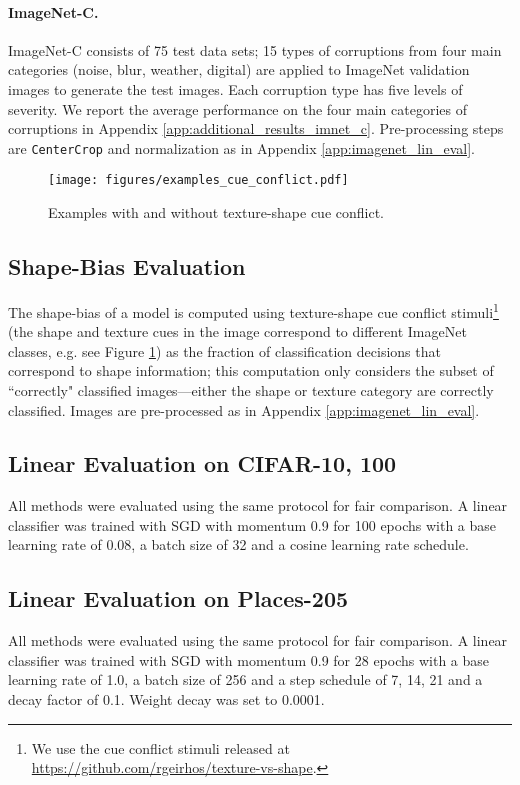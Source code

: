 \documentclass[twoside,11pt]{article}
\begin{document}
\paragraph{ImageNet-C.} ImageNet-C \citep{hendrycks_benchmarking_2019} consists of 75 test data sets; 15 types of corruptions from four main categories (noise, blur, weather, digital) are applied to ImageNet validation images to generate the test images. Each corruption type has five levels of severity. We report the average performance on the four main categories of corruptions in Appendix \ref{app:additional_results_imnet_c}. Pre-processing steps are \texttt{CenterCrop} and normalization as in Appendix \ref{app:imagenet_lin_eval}.


\begin{figure}
    \centering
    \texttt{[image: figures/examples\_cue\_conflict.pdf]}
    \caption{Examples with and without texture-shape cue conflict.}
    \label{fig:cue_conflict_stim}
\end{figure}

\subsection{Shape-Bias Evaluation}
The shape-bias \citep{geirhos2019imagenettrained} of a model is computed using texture-shape cue conflict stimuli\footnote{We use the cue conflict stimuli released at \url{https://github.com/rgeirhos/texture-vs-shape}.} (the shape and texture cues in the image correspond to different ImageNet classes, e.g. see Figure \ref{fig:cue_conflict_stim}) as the fraction of classification decisions that correspond to shape information; this computation only considers the subset of “correctly" classified images---either the shape or texture category are correctly classified. Images are pre-processed as in Appendix \ref{app:imagenet_lin_eval}.


\subsection{Linear Evaluation on CIFAR-10, 100}
All methods were evaluated using the same protocol for fair comparison. A linear classifier was trained with SGD with momentum 0.9 for 100 epochs with a base learning rate of 0.08, a batch size of 32 and a cosine learning rate schedule.


\subsection{Linear Evaluation on Places-205}
All methods were evaluated using the same protocol for fair comparison. A linear classifier was trained with SGD with momentum 0.9 for 28 epochs with a base learning rate of 1.0, a batch size of 256 and a step schedule of 7, 14, 21 and a decay factor of 0.1. Weight decay was set to 0.0001.
\end{document}
